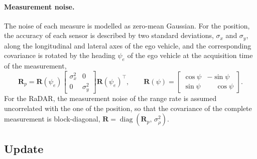 \paragraph{Measurement noise.} The noise of each measure is modelled as zero-mean
Gaussian. For the position, the
accuracy of each sensor is described by two standard deviations, $\sigma_x$ and
$\sigma_y$, along the longitudinal and lateral axes of the ego vehicle, and the corresponding
covariance is rotated by the heading $\psi_e$ of the ego vehicle at the acquisition time of the measurement,
\begin{equation}
    \mathbf{R}_p = \mathbf{R}(\psi_e)
    \begin{bmatrix} \sigma_x^2 & 0 \\ 0 & \sigma_y^2 \end{bmatrix}
    \mathbf{R}(\psi_e)^\top,
    \qquad
    \mathbf{R}(\psi) =
    \begin{bmatrix} \cos\psi & -\sin\psi \\ \sin\psi & \phantom{-}\cos\psi \end{bmatrix}.
    \label{eq:tt_R_rot}
\end{equation}
For the RaDAR, the measurement noise of the range rate is assumed uncorrelated with the one
of the position, so that the covariance of the complete measurement is block-diagonal,
$\mathbf{R} = \operatorname{diag}(\mathbf{R}_p,\,\sigma_{\dot\rho}^2)$. 

\subsection{Update}
\label{subsec:tt_update}

